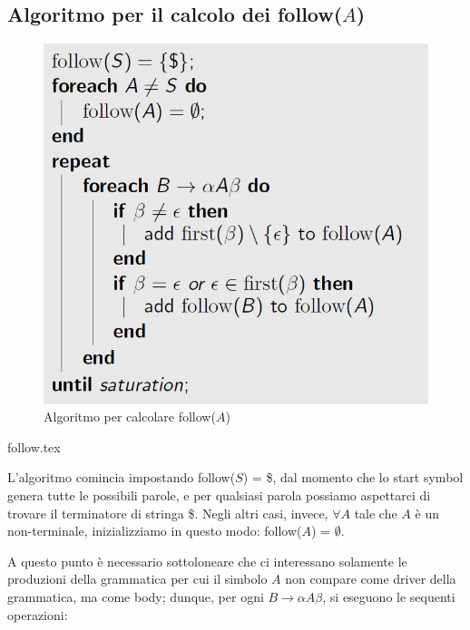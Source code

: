 \documentclass[class=book, crop=false, oneside, 12pt]{standalone}
\begin{document}
\subsection{Algoritmo per il calcolo dei follow(\(A\))}

\begin{figure}[H]
    \centering
    \includegraphics[width=.7\textwidth,keepaspectratio]{follow-algorithm.png}
    \caption{Algoritmo per calcolare follow(\(A\))}
    \label{follow-algorithm}
\end{figure}
{follow.tex}

L'algoritmo comincia impostando follow(\(S\)) = \$, dal momento che lo start symbol genera tutte le possibili parole, e per qualsiasi parola possiamo aspettarci di trovare il terminatore di stringa \$. Negli altri casi, invece, \(\forall A\) tale che \(A\) è un non-terminale, inizializziamo in questo modo: follow(\(A\)) = \(\emptyset\).

A questo punto è necessario sottoloneare che ci interessano solamente le produzioni della grammatica per cui il simbolo \(A\) non compare come driver della grammatica, ma come body; dunque, per ogni \(B \rightarrow \alpha A \beta\), si eseguono le sequenti operazioni: 
\end{document}
